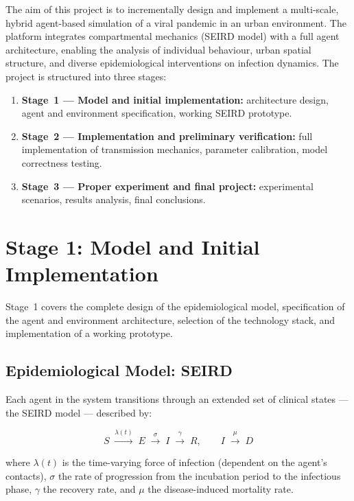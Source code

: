 \documentclass[english]{projectreport}
\begin{document}
The aim of this project is to incrementally design and implement a multi-scale,
hybrid agent-based simulation of a viral pandemic in an urban environment. The
platform integrates compartmental mechanics (SEIRD model) with a full agent
architecture, enabling the analysis of individual behaviour, urban spatial
structure, and diverse epidemiological interventions on infection dynamics.
The project is structured into three stages:

\begin{enumerate}
  \item \textbf{Stage~1 --- Model and initial implementation:} architecture
        design, agent and environment specification, working SEIRD prototype.
  \item \textbf{Stage~2 --- Implementation and preliminary verification:} full
        implementation of transmission mechanics, parameter calibration, model
        correctness testing.
  \item \textbf{Stage~3 --- Proper experiment and final project:} experimental
        scenarios, results analysis, final conclusions.
\end{enumerate}

\section{Stage 1: Model and Initial Implementation}
\label{sec:stage1}

Stage~1 covers the complete design of the epidemiological model, specification
of the agent and environment architecture, selection of the technology stack,
and implementation of a working prototype.

\subsection{Epidemiological Model: SEIRD}
\label{sec:seird}

Each agent in the system transitions through an extended set of clinical
states --- the SEIRD model --- described by:

\begin{equation}
  S \;\xrightarrow{\lambda(t)}\; E \;\xrightarrow{\sigma}\; I
  \;\xrightarrow{\gamma}\; R, \qquad I \;\xrightarrow{\mu}\; D
  \label{eq:seird}
\end{equation}

\noindent where $\lambda(t)$ is the time-varying force of infection (dependent
on the agent's contacts), $\sigma$ the rate of progression from the incubation
period to the infectious phase, $\gamma$ the recovery rate, and $\mu$ the
disease-induced mortality rate.
\end{document}
